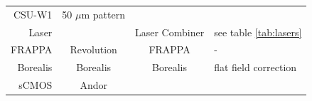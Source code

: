 \documentclass[11pt,singlespacinge,twoside]{reedthesis} %
\begin{document}
\begin{longtable}[]{@{}rccl@{}}
\begin{minipage}[t]{0.23\columnwidth}
CSU-W1\strut
\end{minipage} & \begin{minipage}[t]{0.30\columnwidth}\raggedright
50 \(\mu\)m pattern\strut
\end{minipage}\tabularnewline
\begin{minipage}[t]{0.20\columnwidth}\raggedleft
Laser\strut
\end{minipage} & \begin{minipage}[t]{0.16\columnwidth}\centering
\strut
\end{minipage} & \begin{minipage}[t]{0.23\columnwidth}\centering
Laser Combiner\strut
\end{minipage} & \begin{minipage}[t]{0.30\columnwidth}\raggedright
see table \ref{tab:lasers}\strut
\end{minipage}\tabularnewline
\begin{minipage}[t]{0.20\columnwidth}\raggedleft
FRAPPA\strut
\end{minipage} & \begin{minipage}[t]{0.16\columnwidth}\centering
Revolution\strut
\end{minipage} & \begin{minipage}[t]{0.23\columnwidth}\centering
FRAPPA\strut
\end{minipage} & \begin{minipage}[t]{0.30\columnwidth}\raggedright
-\strut
\end{minipage}\tabularnewline
\begin{minipage}[t]{0.20\columnwidth}\raggedleft
Borealis\strut
\end{minipage} & \begin{minipage}[t]{0.16\columnwidth}\centering
Borealis\strut
\end{minipage} & \begin{minipage}[t]{0.23\columnwidth}\centering
Borealis\strut
\end{minipage} & \begin{minipage}[t]{0.30\columnwidth}\raggedright
flat field correction\strut
\end{minipage}\tabularnewline
\begin{minipage}[t]{0.20\columnwidth}\raggedleft
sCMOS\strut
\end{minipage} & \begin{minipage}[t]{0.16\columnwidth}\centering
Andor\strut
\end{minipage} & \begin{minipage}[t]{0.23\columnwidth}\centering

\end{minipage}
\end{longtable}
\end{document}
